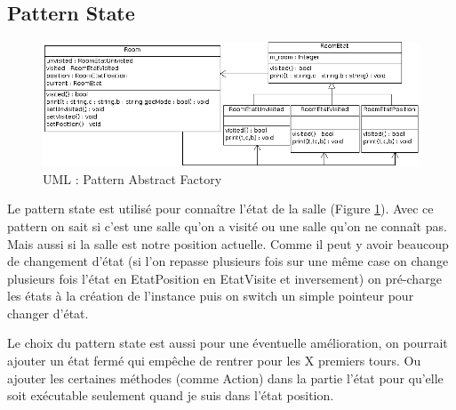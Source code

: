 \documentclass[a4paper]{article}
\begin{document}
    \subsection{Pattern State}
      \begin{figure}[h]
        \centering
        \includegraphics[width=15cm]{./State_UML.png}
        \caption{\label{fig:State_UML} UML : Pattern Abstract Factory}
      \end{figure}

Le pattern state est utilisé pour connaître l'état de la salle (Figure \ref{fig:State_UML}\footnotemark[1]).
Avec ce pattern on sait si c'est une salle qu'on a visité ou une salle qu'on ne connaît pas. Mais aussi si la salle est notre position actuelle.
Comme il peut y avoir beaucoup de changement d'état (si l'on repasse plusieurs fois sur une même case on change plusieurs fois l'état en EtatPosition en EtatVisite et inversement) on pré-charge les états à la création de l'instance puis on switch un simple pointeur pour changer d'état.

Le choix du pattern state est aussi pour une éventuelle amélioration, on pourrait ajouter un état fermé qui empêche de rentrer pour les X premiers tours.
Ou ajouter les certaines méthodes (comme Action) dans la partie l'état pour qu'elle soit exécutable seulement quand je suis dans l'état position.
\end{document}
